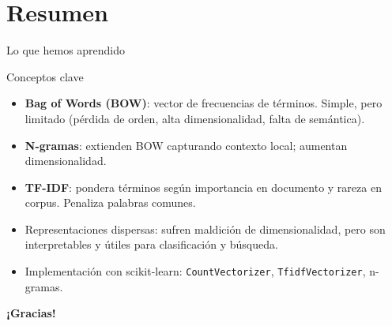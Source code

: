 \documentclass[aspectratio=169, 10pt, xcolor=table]{beamer}
\begin{document}
\section{Resumen}

\begin{frame}{Lo que hemos aprendido}
    \begin{exampleblock}{Conceptos clave}
        \begin{itemize}
            \item \textbf{Bag of Words (BOW)}: vector de frecuencias de términos. Simple, pero limitado (pérdida de orden, alta dimensionalidad, falta de semántica).
            \item \textbf{N-gramas}: extienden BOW capturando contexto local; aumentan dimensionalidad.
            \item \textbf{TF-IDF}: pondera términos según importancia en documento y rareza en corpus. Penaliza palabras comunes.
            \item Representaciones dispersas: sufren maldición de dimensionalidad, pero son interpretables y útiles para clasificación y búsqueda.
            \item Implementación con scikit-learn: \texttt{CountVectorizer}, \texttt{TfidfVectorizer}, n-gramas.
        \end{itemize}
    \end{exampleblock}
\end{frame}

\begin{frame}
    \centering
    \Huge \textbf{¡Gracias!}

\end{frame}
\end{document}
